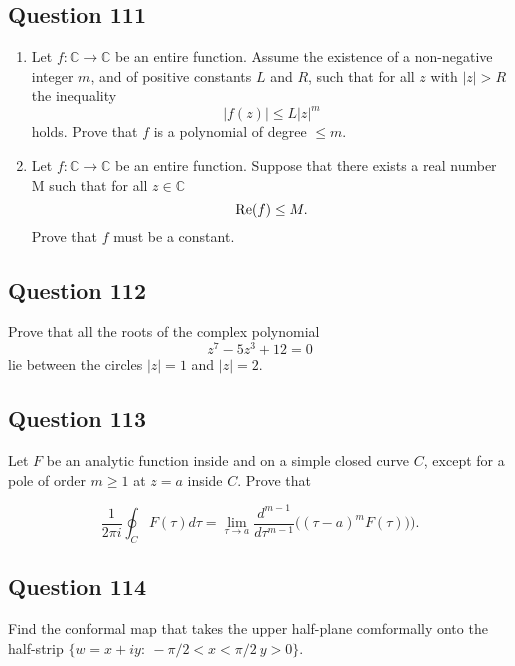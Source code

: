 \documentclass[12pt]{article}
\begin{document}
\hypertarget{question-111-1}{%
\subsection{Question 111}\label{question-111-1}}

\begin{enumerate}
\def\labelenumi{(\alph{enumi})}
\item
  Let \(f:{\mathbb C}\rightarrow {\mathbb C}\) be an entire function.
  Assume the existence of a non-negative integer \(m\), and of positive
  constants \(L\) and \(R\), such that for all \(z\) with \(|z|>R\) the
  inequality \[|f(z)| \leq L |z|^m\] holds. Prove that \(f\) is a
  polynomial of degree \(\leq m\).
\item
  Let \(f:{\mathbb C}\rightarrow {\mathbb C}\) be an entire function.
  Suppose that there exists a real number M such that for all
  \(z\in {\mathbb C}\) \[\mbox{\textrm Re} (f) \leq M.\] Prove that
  \(f\) must be a constant.
\end{enumerate}

\hypertarget{question-112-1}{%
\subsection{Question 112}\label{question-112-1}}

Prove that all the roots of the complex polynomial
\[z^7 - 5 z^3 +12 =0\] lie between the circles \(|z|=1\) and \(|z|=2\).

\hypertarget{question-113-1}{%
\subsection{Question 113}\label{question-113-1}}

Let \(F\) be an analytic function inside and on a simple closed curve
\(C\), except for a pole of order \(m\geq 1\) at \(z=a\) inside \(C\).
Prove that

\[
\frac{1}{2 \pi i}\oint_{C} F(\tau) d\tau = 
\lim_{\tau\rightarrow a} \frac{d^{m-1}}{d\tau^{m-1}}\big((\tau-a)^m F(\tau))\big)
.\]

\hypertarget{question-114-1}{%
\subsection{Question 114}\label{question-114-1}}

Find the conformal map that takes the upper half-plane comformally onto
the half-strip \(\{ w=x+iy:\ -\pi/2<x<\pi/2\ y>0\}\).
\end{document}
